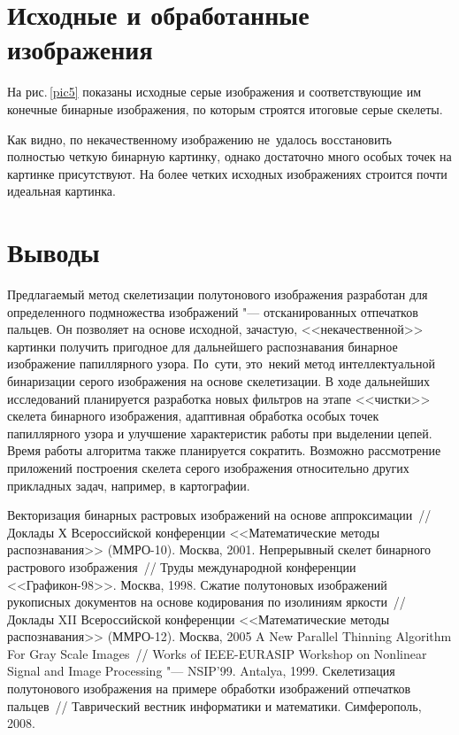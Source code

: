 \documentclass[twoside]{article}
\begin{document}
\section{Исходные и обработанные\\ изображения}
На рис.\,\ref{pic5} показаны исходные серые изображения и соответствующие им конечные бинарные изображения, по которым строятся итоговые серые скелеты.

Как видно, по некачественному изображению не~удалось восстановить полностью четкую бинарную картинку, однако достаточно много особых точек на картинке присутствуют. На более четких исходных изображениях строится почти идеальная картинка.

\balance
\section{Выводы}
Предлагаемый метод скелетизации полутонового изображения разработан для определенного подмножества изображений "--- отсканированных отпечатков пальцев. Он позволяет на основе исходной, зачастую,  <<некачественной>> картинки получить пригодное для дальнейшего распознавания бинарное изображение папиллярного узора. \mbox{По сути}, это~некий метод интеллектуальной бинаризации серого изображения на основе скелетизации. В ходе дальнейших исследований планируется разработка новых фильтров на этапе <<чистки>> скелета бинарного изображения, адаптивная обработка особых точек папиллярного узора и улучшение характеристик работы при выделении цепей. Время работы алгоритма также планируется сократить. Возможно рассмотрение приложений построения скелета серого изображения относительно других прикладных задач, например, в карто\-графии.

\begin{thebibliography}{1}
    Векторизация бинарных растровых изображений на основе аппроксимации~//
    Доклады Х Всероссийской конференции <<Математические методы распознавания>> (ММРО-10). Москва, 2001.
    Непрерывный скелет бинарного растрового изображения~//
    Труды международной конференции <<Графикон-98>>. Москва, 1998.
    Сжатие  полутоновых изображений рукописных документов на основе кодирования по изолиниям яркости~//
    Доклады XII Всероссийской конференции <<Математические методы распознавания>> (ММРО-12). Москва, 2005
    A New Parallel Thinning Algorithm For Gray Scale Images~//
    Works of  IEEE-EURASIP Workshop on Nonlinear Signal and Image Processing "--- NSIP'99. Antalya, 1999.
    Скелетизация полутонового изображения на примере обработки изображений отпечатков пальцев~//
    Таврический вестник информатики и математики. Симферополь, 2008.
\end{thebibliography}

\ACCEPTNOTE
\end{document}
